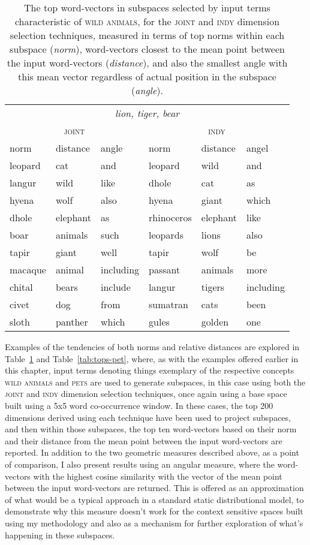 \begin{table} \label{tab:wild}
\centering
\begin{tabular}{lll|lll}
\hline
\multicolumn{6}{c}{\emph{lion, tiger, bear}} \\
\multicolumn{3}{c}{\textsc{joint}} & \multicolumn{3}{c}{\textsc{indy}} \\
\hline
norm & distance & angle & norm & distance & angel \\
\hline
leopard & cat & and & leopard & wild & and \\
langur & wild & like & dhole & cat & as \\
hyena & wolf & also & hyena & giant & which \\
dhole & elephant & as & rhinoceros & elephant & like \\
boar & animals & such & leopards & lions & also \\
tapir & giant & well & tapir & wolf & be \\
macaque & animal & including & passant & animals & more \\
chital & bears & include & langur & tigers & including \\
civet & dog & from & sumatran & cats & been \\
sloth & panther & which & gules & golden & one \\
\hline
\end{tabular}
\caption{The top word-vectors in subspaces selected by input terms characteristic of \textsc{wild animals}, for the \textsc{joint} and \textsc{indy} dimension selection techniques, measured in terms of top norms within each subspace (\emph{norm}), word-vectors closest to the mean point between the input word-vectors (\emph{distance}), and also the smallest angle with this mean vector regardless of actual position in the subspace (\emph{angle}).}
\label{tab:tops-wild}
\end{table}

Examples of the tendencies of both norms and relative distances are explored in Table~\ref{tab:tops-wild} and Table~\ref{tab:tops-pet}, where, as with the examples offered earlier in this chapter, input terms denoting things exemplary of the respective concepts \textsc{wild animals} and \textsc{pets} are used to generate subspaces, in this case using both the \textsc{joint} and \textsc{indy} dimension selection techniques, once again using a base space built using a 5x5 word co-occurrence window.  In these cases, the top 200 dimensions derived using each technique have been used to project subspaces, and then within those subspaces, the top ten word-vectors based on their norm and their distance from the mean point between the input word-vectors are reported.  In addition to the two geometric measures described above, as a point of comparison, I also present results using an angular measure, where the word-vectors with the highest cosine similarity with the vector of the mean point between the input word-vectors are returned.  This is offered as an approximation of what would be a typical approach in a standard static distributional model, to demonstrate why this measure doesn't work for the context sensitive spaces built using my methodology and also as a mechanism for further exploration of what's happening in these subspaces.

